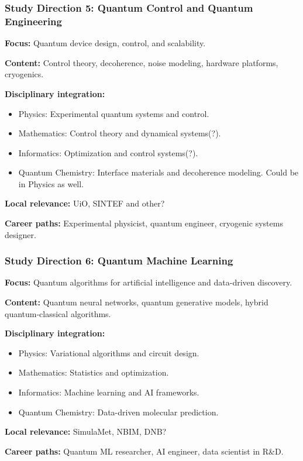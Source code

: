 \documentclass{beamer}
\begin{document}
\begin{frame}
\frametitle{Study Direction 5: Quantum Control and Quantum Engineering}
\textbf{Focus:} Quantum device design, control, and scalability.

\textbf{Content:} Control theory, decoherence, noise modeling, hardware platforms, cryogenics.

\textbf{Disciplinary integration:}
\begin{itemize}
    \item Physics: Experimental quantum systems and control.
    \item Mathematics: Control theory and dynamical systems(?).
    \item Informatics: Optimization and control systems(?).
    \item Quantum Chemistry: Interface materials and decoherence modeling. Could be in Physics as well.
\end{itemize}

\textbf{Local relevance:} UiO, SINTEF and other?

\textbf{Career paths:} Experimental physicist, quantum engineer, cryogenic systems designer.

\end{frame}


\begin{frame}
\frametitle{Study Direction 6: Quantum Machine Learning}
\textbf{Focus:} Quantum algorithms for artificial intelligence and data-driven discovery.

\textbf{Content:} Quantum neural networks, quantum generative models, hybrid quantum-classical algorithms.

\textbf{Disciplinary integration:}
\begin{itemize}
    \item Physics: Variational algorithms and circuit design.
    \item Mathematics: Statistics and optimization.
    \item Informatics: Machine learning and AI frameworks.
    \item Quantum Chemistry: Data-driven molecular prediction.
\end{itemize}

\textbf{Local relevance:} SimulaMet, NBIM, DNB?

\textbf{Career paths:} Quantum ML researcher, AI engineer, data scientist in R\&D.

\end{frame}
\end{document}
